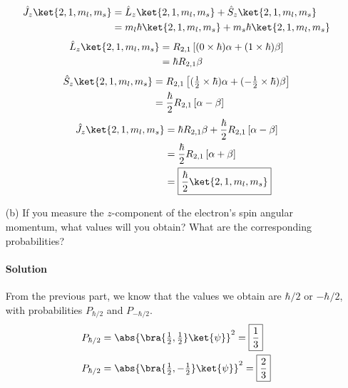 \documentclass{article}
\numberwithin{equation}{section}
\begin{document}
\begin{enumerate}
		\begin{align}
			\hat{J}_z\ket{2,1,m_l,m_s} &= \hat{L}_z\ket{2,1,m_l,m_s} + \hat{S}_z\ket{2,1,m_l,m_s} \\
                                       &= m_l \hbar\ket{2,1,m_l,m_s} + m_s \hbar\ket{2,1,m_l,m_s}
		\end{align}
		\begin{align}
			\hat{L}_z\ket{2,1,m_l,m_s} &= R_{2,1} \left[ (0 \times \hbar) \alpha + (1 \times \hbar) \beta \right] \\
                                       &= \hbar R_{2,1} \beta
		\end{align}
		\begin{align}
			\hat{S}_z\ket{2,1,m_l,m_s} &= R_{2,1} \left[ (\tfrac{1}{2} \times \hbar) \alpha + (-\tfrac{1}{2} \times \hbar) \beta \right] \\
                                       &= \frac{\hbar}{2} R_{2,1} \left[ \alpha - \beta \right]
		\end{align}
		\begin{align}
			\hat{J}_z\ket{2,1,m_l,m_s} &= \hbar R_{2,1} \beta + \frac{\hbar}{2} R_{2,1} \left[ \alpha - \beta \right] \\
                                       &= \frac{\hbar}{2} R_{2,1} \left[ \alpha + \beta \right] \\
                                       &= \boxed{\frac{\hbar}{2} \ket{2,1,m_l,m_s}}
		\end{align}
		
		\item[(b)] If you measure the $z$-component of the electron’s spin angular momentum, what values will you obtain? What are the corresponding probabilities? 
		\paragraph{Solution} From the previous part, we know that the values we obtain are $\hbar/2$ or $-\hbar/2$, with probabilities $P_{\hbar/2}$ and $P_{-\hbar/2}$.
        \begin{align}
            P_{\hbar/2} &= \abs{ \bra{\tfrac{1}{2}, \tfrac{1}{2}} \ket{\psi} }^2 = \boxed{\frac{1}{3}} \\
            P_{\hbar/2} &= \abs{ \bra{\tfrac{1}{2}, -\tfrac{1}{2}} \ket{\psi} }^2 = \boxed{\frac{2}{3}}
        \end{align}
		

\end{enumerate}
\end{document}
